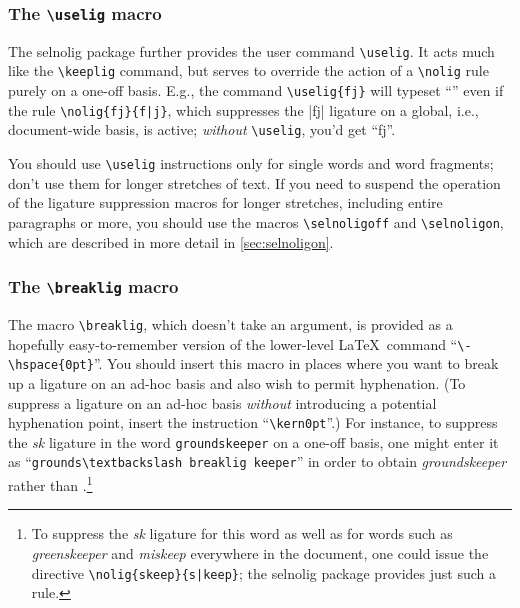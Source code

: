 \documentclass[11pt]{article}
\newcommand{\pkg}[1]{\textsf{#1}}
\newcommand{\cmmd}[1]{\texttt{\textbackslash #1}}
\begin{document}
\subsubsection{The \cmmd{uselig} macro} 
\label{sec:uselig}

The \pkg{selnolig} package further provides the user command \cmmd{uselig}. It acts much like the \cmmd{keeplig} command, but serves to override the action of a \cmmd{nolig} rule purely on a one-off basis. E.g., the command \Verb+\uselig{fj}+ will typeset \enquote{} even if the rule \Verb+\nolig{fj}{f|j}+, which suppresses the |fj| ligature on a global, i.e., document-wide basis, is active; \emph{without} \cmmd{uselig}, you'd get \enquote{fj}.

You should use \cmmd{uselig} instructions only for single words and word fragments; don't use them for longer stretches of text. If you need to suspend the operation of the ligature suppression macros for longer stretches, including entire paragraphs or more, you should use the macros \cmmd{selnoligoff} and \cmmd{selnoligon}, which are described in more detail in \cref{sec:selnoligon}.



\subsubsection{The \cmmd{breaklig} macro} 
\label{sec:breaklig}

The macro \cmmd{breaklig}, which doesn't take an argument, is provided as a hopefully easy-to-remember version of the lower-level \LaTeX\ command ``\Verb+\-\hspace{0pt}+''. You should insert this macro in places where you want to break up a ligature on an ad-hoc basis and also wish to permit hyphenation. (To suppress a ligature on an ad-hoc basis \emph{without} introducing a potential hyphenation point, insert the instruction \enquote{\cmmd{kern0pt}}.) For instance, to suppress the {\ebg\emph{sk}} ligature in the word \Verb+groundskeeper+ on a one-off basis, one might enter it as \enquote{\Verb+grounds\textbackslash breaklig keeper+} in order to obtain \emph{\ebg groundskeeper} rather than \emph{\ebg {}}.\footnote{To suppress the {\ebg \emph{sk}} ligature for this word as well as for words such as \emph{\ebg greenskeeper} and \emph{\ebg miskeep} everywhere in the document, one could issue the directive \Verb+\nolig{skeep}{s|keep}+; the \pkg{selnolig} package provides just such a rule.}
\end{document}
